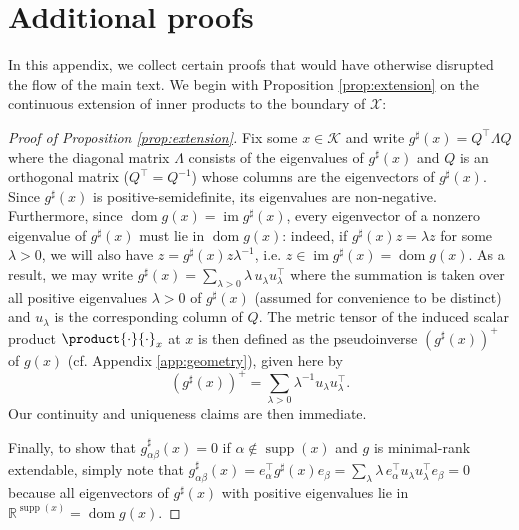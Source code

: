 \documentclass[reqno]{amsart}
\theoremstyle{plain}
\theoremstyle{definition}
\theoremstyle{remark}
\numberwithin{equation}{section}
\numberwithin{theorem}{section}
\begin{document}
\section{Additional proofs}
\label{app:proofs}

In this appendix, we collect certain proofs that would have otherwise disrupted the flow of the main text.
We begin with Proposition \ref{prop:extension} on the continuous extension of inner products to the boundary of ${\mathcal{X}}$:

\begin{proof}[Proof of Proposition \ref{prop:extension}]
Fix some $x\in{\mathcal{K}}$ and write $g^{\sharp}(x) = Q^{\top}\Lambda Q$ where the diagonal matrix $\Lambda$ consists of the eigenvalues of $g^{\sharp}(x)$ and $Q$ is an orthogonal matrix ($Q^{\top} = Q^{-1}$) whose columns are the eigenvectors of $g^{\sharp}(x)$.
Since $g^{\sharp}(x)$ is positive-semidefinite, its eigenvalues are non-negative.
Furthermore, since ${\operatorname{dom} g}(x) = \operatorname{im} g^{\sharp}(x)$, every eigenvector of a nonzero eigenvalue of $g^{\sharp}(x)$ must lie in ${\operatorname{dom} g}(x)$:
indeed, if $g^{\sharp}(x) z = \lambda z$ for some $\lambda>0$, we will also have $z = g^{\sharp}(x)z\lambda^{-1}$, i.e. $z\in\operatorname{im} g^{\sharp}(x) = {\operatorname{dom} g} (x)$.
As a result, we may write $g^{\sharp}(x) = \sum_{\lambda>0} \lambda\, {u}_{\lambda} {u}_{\lambda}^{\top}$ where the summation is taken over all positive eigenvalues $\lambda>0$ of $g^{\sharp}(x)$ (assumed for convenience to be distinct) and ${u}_{\lambda}$ is the corresponding column of $Q$.
The metric tensor of the induced scalar product $\product{\mathopen{}\cdot\mathopen{}}{\mathopen{}\cdot\mathopen{}}_{x}$ at $x$ is then defined as the pseudoinverse $( g^{\sharp}(x) )^{+} $ of $g(x)$ (cf. Appendix \ref{app:geometry}), given here by
\begin{equation}
\label{eq:product-eig}
( g^{\sharp}(x) )^{+} 
= {\sum\nolimits}_{\lambda>0} \lambda^{-1}  {u}_{\lambda} {u}_{\lambda}^{\top}.
\end{equation}
Our continuity and uniqueness claims are then immediate.

Finally, to show that $g_{\alpha\beta}^{\sharp}(x) = 0$ if $\alpha\notin\operatorname{supp}(x)$ and $g$ is minimal-rank extendable, simply note that $g_{\alpha\beta}^{\sharp}(x) = {e}_{\alpha}^{\top} g^{\sharp}(x) {e}_{\beta} = {\sum\nolimits}_{\lambda} \lambda\, {e}_{\alpha}^{\top} {u}_{\lambda} {u}_{\lambda}^{\top} {e}_{\beta} = 0$ because all eigenvectors of $g^{\sharp}(x)$ with positive eigenvalues lie in ${\mathbb{R}}^{\operatorname{supp}(x)} = {\operatorname{dom} g}(x)$.
\end{proof}
\end{document}
